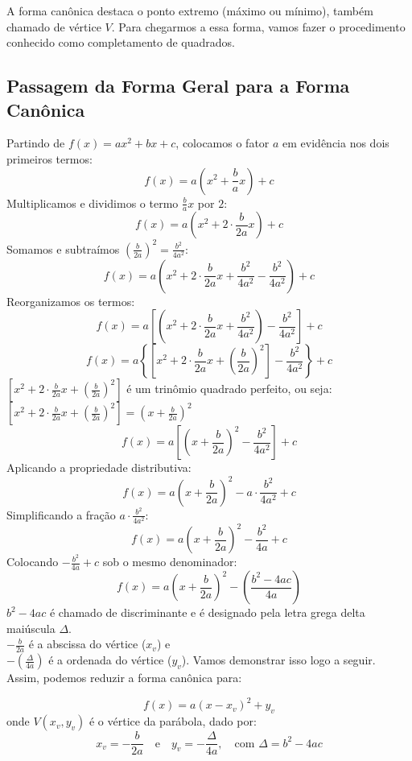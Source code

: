 \documentclass[12pt,a4paper]{report}
\begin{document}
	A forma canônica destaca o ponto extremo (máximo ou mínimo), também chamado de vértice $V$. Para chegarmos a essa forma, vamos fazer o procedimento conhecido como completamento de quadrados.
	
	\subsection{Passagem da Forma Geral para a Forma Canônica}
	
	Partindo de $f(x) = ax^2 + bx + c$, colocamos o fator $a$ em evidência nos dois primeiros termos:
		$$f(x)= a\left(x^2 + \frac{b}{a}x\right) + c $$
		Multiplicamos e dividimos o termo  $\frac{b}{a}x$ por $2$: 
		$$f(x) = a\left(x^2 + 2 \cdot \frac{b}{2a}x\right) + c $$
		Somamos e subtraímos $\left( \frac{b}{2a} \right)^2 =  \frac{b^2}{4a^2}$: 
		$$f(x) = a\left(x^2 + 2\cdot \frac{b}{2a}x + \frac{b^2}{4a^2} - \frac{b^2}{4a^2}\right) + c $$
		Reorganizamos os termos:
		$$f(x) = a\left[ \left( x^2 + 2\cdot \frac{b}{2a}x + \frac{b^2}{4a^2} \right)  - \frac{b^2}{4a^2} \right] + c $$
		$$f(x) = a \left\lbrace  \left[x^2 + 2\cdot \frac{b}{2a}x + \left( \frac{b}{2a} \right)^2 \right]  - \frac{b^2}{4a^2} \right\rbrace + c $$
		$\left[x^2 + 2\cdot \frac{b}{2a}x + \left( \frac{b}{2a} \right)^2 \right]$ é um trinômio quadrado perfeito, ou seja:\\[0.2cm] 
		$\left[x^2 + 2\cdot \frac{b}{2a}x + \left( \frac{b}{2a} \right)^2 \right] = \left(x + \frac{b}{2a}\right)^2 $
		$$f(x) = a \left[  \left(x + \frac{b}{2a}\right)^2 - \frac{b^2}{4a^2} \right]  + c $$
		Aplicando a propriedade distributiva:
		$$f(x) = a \left(x + \frac{b}{2a}\right)^2 - a \cdot \frac{b^2}{4a^2} + c $$
		Simplificando a fração $a \cdot \frac{b^2}{4a^2}$:
		$$f(x) = a \left(x + \frac{b}{2a}\right)^2 - \frac{b^2}{4a} + c $$
		Colocando $- \frac{b^2}{4a} + c$ sob o mesmo denominador:
		$$f(x) = a\left(x + \frac{b}{2a}\right)^2 - \left(\frac{b^2 - 4ac}{4a}\right) $$
		$b^2 - 4ac$ é chamado de discriminante e é designado pela letra grega delta maiúscula $\Delta$.\\[0.2cm]
		$-\frac{b}{2a}$ é a abscissa do vértice ($x_v$) e \\[0.2cm]
		$ - \left(\frac{\Delta}{4a}\right)$ é a ordenada do vértice ($y_v$). Vamos demonstrar isso logo a seguir. \\[0.2cm]
		Assim, podemos reduzir a forma canônica para:
	
	\begin{destaque}
		\label{dest:formacanonica}
		$$f(x) = a(x - x_v)^2 + y_v$$
		onde $V(x_v, y_v)$ é o vértice da parábola, dado por:
		$$x_v = -\frac{b}{2a} \quad \text{e} \quad y_v = -\frac{\Delta}{4a}, \quad \text{com } \Delta = b^2 - 4ac$$
	\end{destaque}
	
\end{document}
